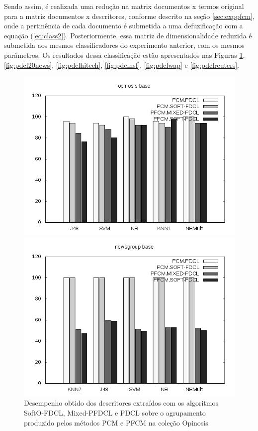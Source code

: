 Sendo assim, é realizada uma redução na matrix documentos x termos original para a matriz documentos
x descritores, conforme descrito na seção \ref{sec:exppfcm}, onde a pertinência de cada documento é
submetida a uma defuzificação com a equação (\ref{eq:class2}). Posteriormente, essa matriz de
dimensionalidade reduzida é submetida aos mesmos classificadores do experimento anterior, com os
mesmos parâmetros. Os resultados dessa classificação estão apresentados nas Figuras
\ref{fig:pdclopinosis}, \ref{fig:pdcl20news}, \ref{fig:pdclhitech}, \ref{fig:pdclnsf},
\ref{fig:pdclwap} e \ref{fig:pdclreuters}.

\begin{figure}[!h] \centering 
   \begin{minipage}{0.48\textwidth} 
     \centering
    \includegraphics[width=1.0\columnwidth]{assets/pdcl/opinosis} 
    \caption{Desempenho obtido dos descritores extraídos com os algoritmos SoftO-FDCL, Mixed-PFDCL e
    PDCL sobre o agrupamento produzido pelos métodos PCM e PFCM na coleção Opinosis} 
  \label{fig:pdclopinosis}
  \end{minipage}\hfill 
  \begin{minipage}{0.48\textwidth} \centering
    \includegraphics[width=1.0\columnwidth]{assets/pdcl/newsgroup} 

\end{minipage}
\end{figure}
